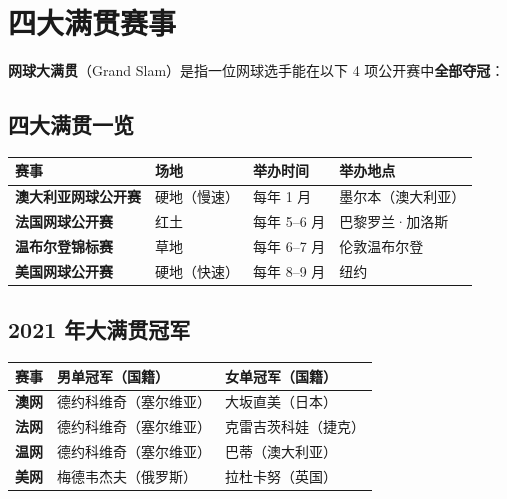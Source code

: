 \chapter{四大满贯赛事}

\textbf{网球大满贯}（Grand Slam）是指一位网球选手能在以下 4 项公开赛中\textbf{全部夺冠}：

\section{四大满贯一览}

\begin{center}
\begin{tabular}{@{} >{\bfseries}l l l l @{}}
    \toprule
    赛事 & 场地 & 举办时间 & 举办地点 \\
    \midrule
    澳大利亚网球公开赛 & 硬地（慢速） & 每年 1 月 & 墨尔本（澳大利亚） \\
    法国网球公开赛 & 红土 & 每年 5--6 月 & 巴黎罗兰·加洛斯 \\
    温布尔登锦标赛 & 草地 & 每年 6--7 月 & 伦敦温布尔登 \\
    美国网球公开赛 & 硬地（快速） & 每年 8--9 月 & 纽约 \\
    \bottomrule
\end{tabular}
\end{center}


\section{2021 年大满贯冠军}

\begin{center}
\begin{tabular}{@{} >{\bfseries}l l l @{}}
    \toprule
    赛事 & 男单冠军（国籍） & 女单冠军（国籍） \\
    \midrule
    澳网 & 德约科维奇（塞尔维亚） & 大坂直美（日本） \\
    法网 & 德约科维奇（塞尔维亚） & 克雷吉茨科娃（捷克） \\
    温网 & 德约科维奇（塞尔维亚） & 巴蒂（澳大利亚） \\
    美网 & 梅德韦杰夫（俄罗斯） & 拉杜卡努（英国） \\
    \bottomrule
\end{tabular}
\end{center}

